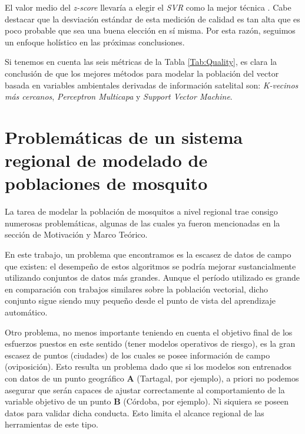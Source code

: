   \par El valor medio del \textit{z-score} llevaría a elegir el \textit{SVR}
    como la mejor técnica \cite{ml_rainfall}. Cabe destacar que la desviación
    estándar de esta medición de calidad es tan alta que es poco probable que
    sea una buena elección en sí misma. Por esta razón, seguimos un
    enfoque holístico en las próximas conclusiones.


  \par Si tenemos en cuenta las seis métricas de la Tabla \ref{Tab:Quality},
    es clara la conclusión de que los mejores métodos para modelar la población
    del vector basada en variables ambientales derivadas de información satelital
    son: \textit{K-vecinos más cercanos}, \textit{Perceptron
    Multicapa} y \textit{Support Vector Machine}.


\section{Problemáticas de un sistema regional de modelado de poblaciones de mosquito}

  \par La tarea de modelar la población de mosquitos a nivel regional
    trae consigo numerosas problemáticas, algunas de las cuales ya fueron
    mencionadas en la sección de Motivación y Marco Teórico.

  \par En este trabajo, un problema que encontramos es la escasez de datos de campo que existen:
    el desempeño de estos algoritmos se podría mejorar sustancialmente utilizando
    conjuntos de datos más grandes.
    Aunque el período utilizado es grande en comparación con trabajos similares
    sobre la población vectorial, dicho conjunto sigue siendo
    muy pequeño desde el punto de vista del aprendizaje automático.

  \par Otro problema, no menos importante teniendo en cuenta el objetivo final
    de los esfuerzos puestos en este sentido (tener modelos operativos de
    riesgo), es la gran escasez de puntos (ciudades) de los cuales se posee información
    de campo (oviposición). Esto resulta un problema dado que si los modelos son
    entrenados con datos de un punto geográfico \textbf{A} (Tartagal, por ejemplo), a
    priori no podemos asegurar que serán capaces de ajustar correctamente al
    comportamiento de la variable objetivo de un punto \textbf{B} (Córdoba, por ejemplo).
    Ni siquiera se poseen datos para validar dicha conducta.
    Esto limita el alcance regional de las herramientas de este tipo.

%
